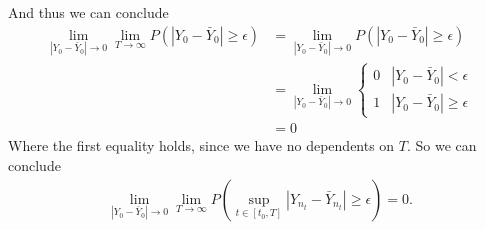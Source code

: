 And thus we can conclude 
\begin{align}
\lim_{|Y_0-\bar{Y}_0|\rightarrow 0}\lim_{T\rightarrow \infty} P\left(|Y_{0}-\bar{Y}_{0}|\geq \epsilon\right) &= \lim_{|Y_0-\bar{Y}_0|\rightarrow 0} P\left(|Y_{0}-\bar{Y}_{0}|\geq \epsilon\right)\\
&= \lim_{|Y_0-\bar{Y}_0|\rightarrow 0} 
 \begin{cases} 
      0 &  |Y_{0}-\bar{Y}_{0}| < \epsilon\\
     1& |Y_{0}-\bar{Y}_{0}|\geq \epsilon
   \end{cases}\\
   & = 0
\end{align}
Where the first equality holds, since we have no dependents  on $T$. So we can conclude 
\begin{align}
\lim_{|Y_0-\bar{Y}_0|\rightarrow 0}\lim_{T\rightarrow \infty}  P\left(\sup_{t\in[t_0,T]}|Y_{n_t}-\bar{Y}_{n_t}|\geq \epsilon\right)  = 0.
\end{align}